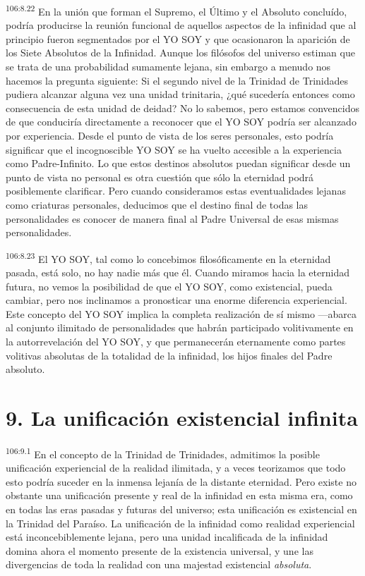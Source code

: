 \par
\textsuperscript{106:8.22} En la unión que forman el Supremo, el Último y el Absoluto concluído, podría producirse la reunión funcional de aquellos aspectos de la infinidad que al principio fueron segmentados por el YO SOY y que ocasionaron la aparición de los Siete Absolutos de la Infinidad. Aunque los filósofos del universo estiman que se trata de una probabilidad sumamente lejana, sin embargo a menudo nos hacemos la pregunta siguiente: Si el segundo nivel de la Trinidad de Trinidades pudiera alcanzar alguna vez una unidad trinitaria, ¿qué sucedería entonces como consecuencia de esta unidad de deidad? No lo sabemos, pero estamos convencidos de que conduciría directamente a reconocer que el YO SOY podría ser alcanzado por experiencia. Desde el punto de vista de los seres personales, esto podría significar que el incognoscible YO SOY se ha vuelto accesible a la experiencia como Padre-Infinito. Lo que estos destinos absolutos puedan significar desde un punto de vista no personal es otra cuestión que sólo la eternidad podrá posiblemente clarificar. Pero cuando consideramos estas eventualidades lejanas como criaturas personales, deducimos que el destino final de todas las personalidades es conocer de manera final al Padre Universal de esas mismas personalidades.

\par
\textsuperscript{106:8.23} El YO SOY, tal como lo concebimos filosóficamente en la eternidad pasada, está solo, no hay nadie más que él. Cuando miramos hacia la eternidad futura, no vemos la posibilidad de que el YO SOY, como existencial, pueda cambiar, pero nos inclinamos a pronosticar una enorme diferencia experiencial. Este concepto del YO SOY implica la completa realización de sí mismo ---abarca al conjunto ilimitado de personalidades que habrán participado volitivamente en la autorrevelación del YO SOY, y que permanecerán eternamente como partes volitivas absolutas de la totalidad de la infinidad, los hijos finales del Padre absoluto.

\section*{9. La unificación existencial infinita}
\par
\textsuperscript{106:9.1} En el concepto de la Trinidad de Trinidades, admitimos la posible unificación experiencial de la realidad ilimitada, y a veces teorizamos que todo esto podría suceder en la inmensa lejanía de la distante eternidad. Pero existe no obstante una unificación presente y real de la infinidad en esta misma era, como en todas las eras pasadas y futuras del universo; esta unificación es existencial en la Trinidad del Paraíso. La unificación de la infinidad como realidad experiencial está inconcebiblemente lejana, pero una unidad incalificada de la infinidad domina ahora el momento presente de la existencia universal, y une las divergencias de toda la realidad con una majestad existencial \textit{absoluta}.

